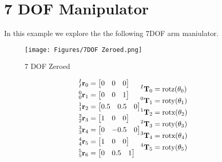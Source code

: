 \section{7 DOF Manipulator}  \label{sec:7dof}

\noindent In this example we explore the the following 7DOF arm maniulator.

\begin{figure}[H]
    \centering
    \texttt{[image: Figures/7DOF Zeroed.png]}
    \caption{7 DOF Zeroed}
    \label{fig:7dofzero}
\end{figure}

\begin{align*}
    \begin{split}
        {^I_I \r _0} &= \begin{bmatrix} 0 & 0 & 0\end{bmatrix} \\
        {^0_0 \r _1} &= \begin{bmatrix} 0 & 0 & 1 \end{bmatrix} \\ 
        {^1_1 \r _2} &= \begin{bmatrix} 0.5& 0.5& 0 \end{bmatrix}\\
        {^2_2 \r _3} &= \begin{bmatrix} 1& 0& 0 \end{bmatrix}\\
        {^3_3 \r _4} &= \begin{bmatrix} 0& -0.5& 0\end{bmatrix}\\
        {^4_4 \r _5} &= \begin{bmatrix} 1& 0& 0 \end{bmatrix}\\
        {^5_5 \r _6} &= \begin{bmatrix} 0 & 0.5 & 1 \end{bmatrix}
    \end{split}
    \begin{split}
        {^I \T_0} &= \text{rotz}(\theta_0)\\
        {^0 \T_1} &= \text{roty}(\theta_1)\\
        {^1 \T_2} &= \text{rotx}(\theta_2)\\
        {^2 \T_3} &= \text{roty}(\theta_3)\\
        {^3 \T_4} &= \text{rotx}(\theta_4)\\
        {^4 \T_5} &= \text{roty}(\theta_5)\\

\end{split}
\end{align*}
